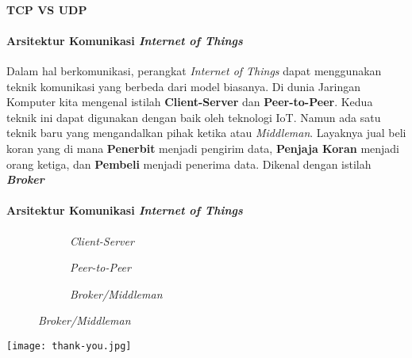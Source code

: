 \begin{frame}{\insertsectionhead}
	\framesubtitle{TCP VS UDP}
	\justifying
	 \begin{figure}[ht!]
		\begin{subfigure}[b]{0.75\textwidth}
		\end{subfigure}
	\end{figure}
\end{frame}

\begin{frame}{\insertsectionhead}
	\framesubtitle{Arsitektur Komunikasi \textit{Internet of Things}}
	\justifying
	Dalam hal berkomunikasi, perangkat \textit{Internet of Things} dapat menggunakan teknik komunikasi yang berbeda dari model biasanya. Di dunia Jaringan Komputer kita mengenal istilah \textbf{Client-Server} dan \textbf{Peer-to-Peer}. 
	\vfill
	Kedua teknik ini dapat digunakan dengan baik oleh teknologi IoT. Namun ada satu teknik baru yang mengandalkan pihak ketika atau \textit{Middleman}. Layaknya jual beli koran yang di mana \textbf{Penerbit} menjadi pengirim data, \textbf{Penjaja Koran} menjadi orang ketiga, dan \textbf{Pembeli} menjadi penerima data. Dikenal dengan istilah \textbf{\textit{Broker}}
\end{frame}

\begin{frame}{\insertsectionhead}
	\framesubtitle{Arsitektur Komunikasi \textit{Internet of Things}}
	\justifying
	  \begin{figure}[ht!]
		\begin{subfigure}[b]{0.3\textwidth}
				\caption*{\textit{Client-Server}}
			\end{subfigure}
		\hspace{\fill}
		\begin{subfigure}[b]{0.3\textwidth}
				\caption*{\textit{Peer-to-Peer}}
			\end{subfigure}
		\hspace{\fill}
		\begin{subfigure}[b]{0.35\textwidth}
				\caption*{\textit{Broker/Middleman}}
			\end{subfigure}
	\end{figure}
\end{frame}

{
	\texttt{[image: thank-you.jpg]}
}
\begin{frame}[plain]
\end{frame}